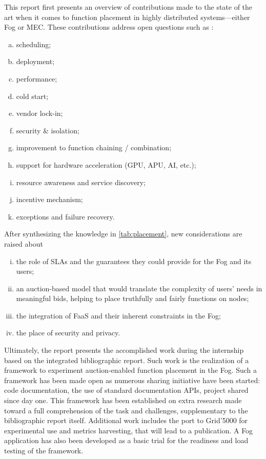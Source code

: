 This report first presents an overview of contributions made to the state of the art when it comes to function placement in highly distributed systems—either Fog or \gls{MEC}. These contributions address open questions such as \cite{kjorveziroski_iot_2021,xie_when_2021}:
\begin{enumerate}[(a)]
	\item scheduling;
	\item deployment;
	\item performance;
	\item cold start;
	\item vendor lock-in;
	\item security \& isolation;
	\item improvement to function chaining / combination;
	\item support for hardware acceleration (\gls{GPU}, \gls{APU}, \gls{AI}, etc.);
	\item resource awareness and service discovery;
	\item incentive mechanism;
	\item exceptions and failure recovery.
\end{enumerate}
After synthesizing the knowledge in \cref{tab:placement}, new considerations are raised about
\begin{enumerate}[(i)]
	\item the role of \glspl{SLA} and the guarantees they could provide for the Fog and its users;
	\item an auction-based model that would translate the complexity of users' needs in meaningful bids, helping to place truthfully and fairly functions on nodes;
	\item the integration of \gls{FaaS} and their inherent constraints in the Fog;
	\item the place of security and privacy.
\end{enumerate}
Ultimately, the report presents the accomplished work during the internship based on the integrated bibliographic report. Such work is the realization of a framework to experiment auction-enabled function placement in the Fog. Such a framework has been made open as numerous sharing initiative have been started: code documentation, the use of standard documentation \glspl{API}, project shared since day one. This framework has been established on extra research made toward a full comprehension of the task and challenges, supplementary to the bibliographic report itself. Additional work includes the port to Grid'5000 for experimental use and metrics harvesting, that will lead to a publication. A Fog application has also been developed as a basic trial for the readiness and load testing of the framework.